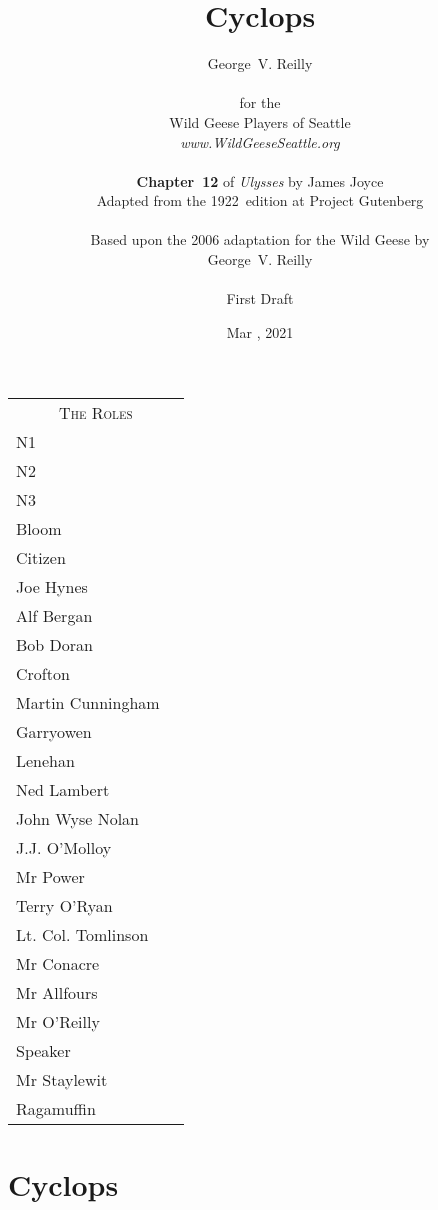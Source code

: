 


\title{\Huge Cyclops}
\author{George~V. Reilly\\
\\
{\small for the}\\
Wild Geese Players of Seattle\\
{\textit{www.WildGeeseSeattle.org}}\\
\\
{\small \textbf{Chapter~12} of \textit{Ulysses} by James Joyce}\\
{\small Adapted from the 1922~edition at Project Gutenberg}
\\
\\
{\small Based upon the 2006 adaptation for the Wild Geese by}\\
{\small George~V. Reilly}\\
\\
{\small First Draft}}
\date{Mar , 2021}
\raggedbottom



\maketitle
\thispagestyle{empty}
\pagebreak

\begin{tabular}{lp{10cm}}
    \multicolumn{2}{c}{\Large \textsc{The Roles}} \\
N1 \\
N2 \\
N3 \\
Bloom \\
Citizen \\
Joe Hynes \\
Alf Bergan \\
Bob Doran \\
Crofton \\
Martin Cunningham \\
Garryowen \\
Lenehan \\
Ned Lambert \\
John Wyse Nolan \\
J.J. O'Molloy \\
Mr Power \\
Terry O'Ryan \\
Lt. Col. Tomlinson \\
Mr Conacre \\
Mr Allfours \\
Mr O'Reilly \\
Speaker \\
Mr Staylewit \\
Ragamuffin \\


\end{tabular}

\thispagestyle{empty}
\newpage


\setcounter{page}{1}

\section*{Cyclops}




